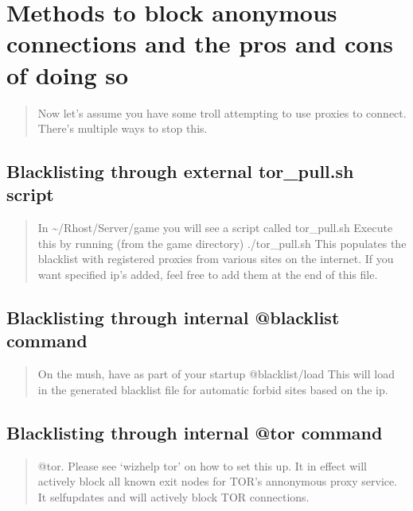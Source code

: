 \documentclass[letterpaper,10pt,english]{sphinxmanual}
\begin{document}
\chapter{Methods to block anonymous connections and the pros and cons of doing so}
\label{\detokenize{09-blocking:methods-to-block-anonymous-connections-and-the-pros-and-cons-of-doing-so}}\label{\detokenize{09-blocking::doc}}\begin{quote}

\sphinxAtStartPar
Now let’s assume you have some troll attempting to use proxies to connect.
There’s multiple ways to stop this.
\end{quote}


\section{Blacklisting through external tor\_pull.sh script}
\label{\detokenize{09-blocking:blacklisting-through-external-tor-pull-sh-script}}\begin{quote}

\sphinxAtStartPar
In \textasciitilde{}/Rhost/Server/game you will see a script called tor\_pull.sh
Execute this by running (from the game directory) ./tor\_pull.sh
This populates the blacklist with registered proxies from various sites
on the internet.  If you want specified ip’s added, feel free to add
them at the end of this file.
\end{quote}


\section{Blacklisting through internal @blacklist command}
\label{\detokenize{09-blocking:blacklisting-through-internal-blacklist-command}}\begin{quote}

\sphinxAtStartPar
On the mush, have as part of your startup @blacklist/load
This will load in the generated blacklist file for automatic forbid
sites based on the ip.
\end{quote}


\section{Blacklisting through internal @tor command}
\label{\detokenize{09-blocking:blacklisting-through-internal-tor-command}}\begin{quote}

\sphinxAtStartPar
@tor.  Please see ‘wizhelp tor’ on how to set this up.  It in effect
will actively block all known exit nodes for TOR’s annonymous proxy
service.  It self\sphinxhyphen{}updates and will actively block TOR connections.
\end{quote}
\end{document}
